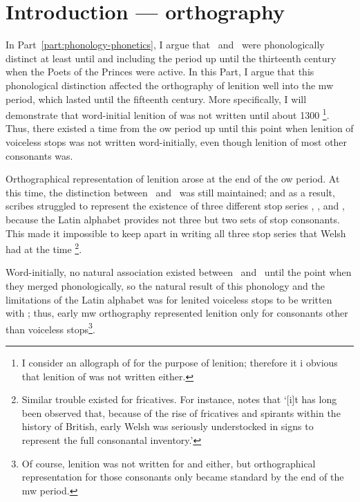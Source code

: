 \chapter{Introduction --- orthography}
\label{cha:intr-orth}

In Part~\ref{part:phonology-phonetics}, I argue that \lT\ and \xD\ were phonologically distinct at least until and including the period up until the thirteenth century when the Poets of the Princes were active. In this Part, I argue that this phonological distinction affected the orthography of lenition well into the \gls{mw} period, which lasted until the fifteenth century. More specifically, I will demonstrate that word-initial lenition of  was not written until about 1300%
\footnote{I consider  an allograph of  for the purpose of lenition; therefore it i obvious that lenition of  was not written either.}.
Thus, there existed a time from the \gls{ow} period up until this point when lenition of  voiceless stops was not written word-initially, even though lenition of most other consonants was.

Orthographical representation of lenition arose at the end of the \gls{ow} period. At this time, the distinction between \lT\ and \xD\ was still maintained; and as a result, scribes struggled to represent the existence of three different stop series \xT, \lT, and \xD, because the Latin alphabet  provides not three but two sets of stop consonants. This made it impossible to keep apart in writing all three stop series that Welsh had at the time%
\footnote{Similar trouble existed for fricatives. For instance, \textcite[28]{russell_rowynniauc_2003} notes that `[i]t has long been observed that, because of the rise of fricatives and spirants within the history of British, early Welsh was seriously understocked in signs to represent the full consonantal inventory.'}.

Word-initially, no natural association existed between \lT\ and \xD\ until the point when they merged phonologically, so the natural result of this phonology and the limitations of the Latin alphabet was for lenited voiceless stops to be written with ; thus, early \gls{mw} orthography represented lenition only for consonants other than voiceless stops\footnote{Of course, lenition was not written for  and  either, but orthographical representation for those consonants only became standard by the end of the \gls{mw} period.}.

